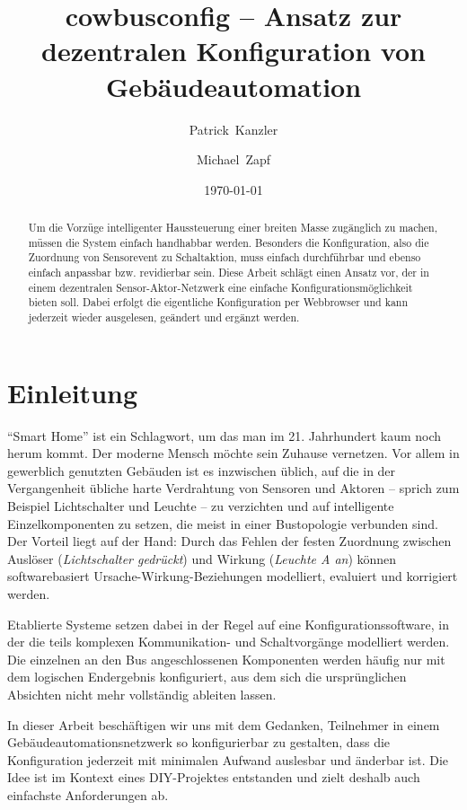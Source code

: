 \documentclass{IEEEtran}
\begin{document}
\title{cowbusconfig -- Ansatz zur dezentralen Konfiguration von Gebäudeautomation}
\author{Patrick~Kanzler \and Michael~Zapf}
\date{\today}



\maketitle

\begin{abstract}
    Um die Vorzüge intelligenter Haussteuerung einer breiten Masse zugänglich
    zu machen, müssen die System einfach handhabbar werden.
    Besonders die Konfiguration, also die Zuordnung von Sensorevent zu
    Schaltaktion, muss einfach durchführbar und ebenso einfach anpassbar
    bzw. revidierbar sein. Diese Arbeit schlägt einen Ansatz vor,
    der in einem dezentralen Sensor-Aktor-Netzwerk eine einfache
    Konfigurationsmöglichkeit bieten soll.
    Dabei erfolgt die eigentliche Konfiguration per Webbrowser und kann
    jederzeit wieder ausgelesen, geändert und ergänzt werden.
\end{abstract}

\section{Einleitung}
    \enquote{Smart Home} ist ein Schlagwort, um das man im 21. Jahrhundert
    kaum noch herum kommt. Der moderne Mensch möchte sein Zuhause vernetzen.
    Vor allem in gewerblich genutzten Gebäuden ist es inzwischen üblich,
    auf die in der Vergangenheit übliche harte Verdrahtung von Sensoren und
    Aktoren -- sprich zum Beispiel Lichtschalter und Leuchte -- zu verzichten
    und auf intelligente Einzelkomponenten zu setzen, die meist in einer
    Bustopologie verbunden sind. Der Vorteil liegt auf der Hand:
    Durch das Fehlen der festen Zuordnung zwischen Auslöser
    (\emph{Lichtschalter gedrückt}) und Wirkung (\emph{Leuchte A an})
    können softwarebasiert Ursache-Wirkung-Beziehungen modelliert, evaluiert
    und korrigiert werden.

    Etablierte Systeme setzen dabei in der Regel auf eine
    Konfigurationssoftware, in der die teils komplexen Kommunikation- und
    Schaltvorgänge modelliert werden.
    Die einzelnen an den Bus angeschlossenen Komponenten werden häufig nur
    mit dem logischen Endergebnis konfiguriert,
    aus dem sich die ursprünglichen Absichten nicht mehr vollständig ableiten
    lassen.

    In dieser Arbeit beschäftigen wir uns mit dem Gedanken,
    Teilnehmer in einem Gebäudeautomationsnetzwerk so konfigurierbar zu gestalten,
    dass die Konfiguration jederzeit mit minimalen Aufwand auslesbar
    und änderbar ist.
    Die Idee ist im Kontext eines DIY-Projektes entstanden und zielt deshalb
    auch einfachste Anforderungen ab.
\end{document}
